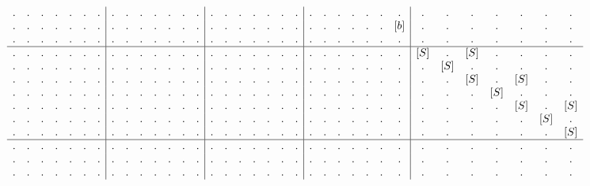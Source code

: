\begin{example}
\begin{align}
\begin{array}{c c c c c c c | c c c c c c c | c c c c c c c | c c c c c c c | c c c c c c c}
. & . & . & . & . & . & .  &  . & . & . & . & . & . & .  &  . & . & . & . & . & . & .  &  . & . & .   & . & .   & . & .    &  . & . & . & . & . & . & .   \\
. & . & . & . & . & . & .  &  . & . & . & . & . & . & .  &  . & . & . & . & . & . & .  &  . & . & .   & . & .   & . & [b]  &  . & . & . & . & . & . & .   \\
. & . & . & . & . & . & .  &  . & . & . & . & . & . & .  &  . & . & . & . & . & . & .  &  . & . & .   & . & .   & . & .    &  . & . & . & . & . & . & .   \\
\hline
. & . & . & . & . & . & .  &  . & . & . & . & . & . & .  &  . & . & . & . & . & . & .  &  . & . & . & . & . & . & .  &  [S] & .   & [S] & .   & .   & .   & .   \\
. & . & . & . & . & . & .  &  . & . & . & . & . & . & .  &  . & . & . & . & . & . & .  &  . & . & . & . & . & . & .  &  .   & [S] & .   & .   & .   & .   & .   \\
. & . & . & . & . & . & .  &  . & . & . & . & . & . & .  &  . & . & . & . & . & . & .  &  . & . & . & . & . & . & .  &  .   & .   & [S] & .   & [S] & .   & .   \\
. & . & . & . & . & . & .  &  . & . & . & . & . & . & .  &  . & . & . & . & . & . & .  &  . & . & . & . & . & . & .  &  .   & .   & .   & [S] & .   & .   & .   \\
. & . & . & . & . & . & .  &  . & . & . & . & . & . & .  &  . & . & . & . & . & . & .  &  . & . & . & . & . & . & .  &  .   & .   & .   & .   & [S] & .   & [S]   \\
. & . & . & . & . & . & .  &  . & . & . & . & . & . & .  &  . & . & . & . & . & . & .  &  . & . & . & . & . & . & .  &  .   & .   & .   & .   & .   & [S] & .   \\
. & . & . & . & . & . & .  &  . & . & . & . & . & . & .  &  . & . & . & . & . & . & .  &  . & . & . & . & . & . & .  &  .   & .   & .   & .   & .   & .   & [S]   \\
\hline
. & . & . & . & . & . & .  &  . & . & . & . & . & . & .  &  . & . & . & . & . & . & .  &  . & . & . & . & . & . & .  &  . & . & . & . & . & . & .   \\
. & . & . & . & . & . & .  &  . & . & . & . & . & . & .  &  . & . & . & . & . & . & .  &  . & . & . & . & . & . & .  &  . & . & . & . & . & . & .   \\
. & . & . & . & . & . & .  &  . & . & . & . & . & . & .  &  . & . & . & . & . & . & .  &  . & . & . & . & . & . & .  &  . & . & . & . & . & . & .   \\

\end{array}
\end{align}
\end{example}
